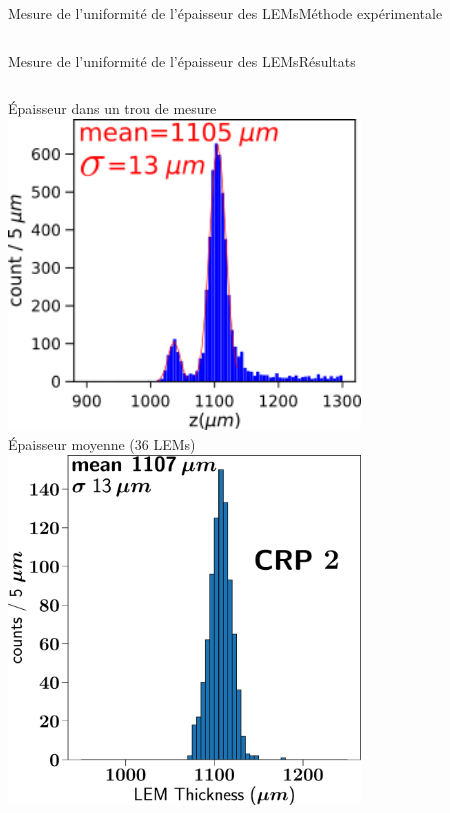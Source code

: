 \begin{frame}{Mesure de l'uniformité de l'épaisseur des LEMs}{Méthode expérimentale}
\begin{scriptsize}
\begin{columns}
\begin{column}{0.5\textwidth}
    			\end{column}
    		\end{columns}
    	\end{scriptsize}
    \end{frame}

    \begin{frame}{Mesure de l'uniformité de l'épaisseur des LEMs}{Résultats}
    	\begin{scriptsize}
    		\begin{columns}
    			\begin{column}{0.48\textwidth}
    				\centering
    				Épaisseur dans un trou de mesure\\
    				\centering
    				\includegraphics[width=0.7\textwidth]{./pictures/distri_1_trou_lem.png}\\
    				\vspace{0.15cm}
    				\centering
    				Épaisseur moyenne (36 LEMs)\\
    				\includegraphics[width=0.7\textwidth]{./pictures/LEM_sum_all_histo_CERN.pdf}

\end{column}
\end{columns}
\end{scriptsize}
\end{frame}
